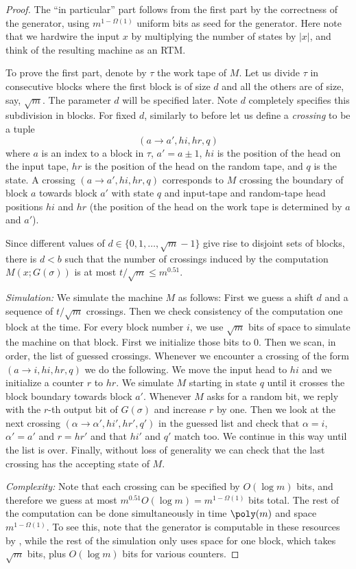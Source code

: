 \begin{proof}
The ``in particular'' part follows from the first part by the correctness
of the generator, using $m^{1-\Omega(1)}$ uniform bits as seed for
the generator. Here note that we hardwire the input $x$ by multiplying
the number of states by $|x|$, and think of the resulting machine
as an RTM.

To prove the first part, denote by $\tau$ the work tape of $M$.
Let us divide $\tau$ in consecutive blocks where the first block
is of size $d$ and all the others are of size, say, $\sqrt{m}$.
The parameter $d$ will be specified later. Note $d$ completely specifies
this subdivision in blocks. For fixed $d$, similarly to before let
us define a \emph{crossing} to be a tuple 
\[
(a\rightarrow a',hi,hr,q)
\]
where $a$ is an index to a block in $\tau$, $a'=a\pm1$, $hi$ is
the position of the head on the input tape, $hr$ is the position
of the head on the random tape, and $q$ is the state. A crossing
$(a\rightarrow a',hi,hr,q)$ corresponds to $M$ crossing the boundary
of block $a$ towards block $a'$ with state $q$ and input-tape and
random-tape head positions $hi$ and $hr$ (the position of the head
on the work tape is determined by $a$ and $a'$).

Since different values of $d\in\{0,1,\ldots,\sqrt{m}-1\}$ give rise
to disjoint sets of blocks, there is $d<b$ such that the number of
crossings induced by the computation $M(x;G(\sigma))$ is at most
$t/\sqrt{m}\leq m^{0.51}$.

\emph{Simulation:} We simulate the machine $M$ as follows: First
we guess a shift $d$ and a sequence of $t/\sqrt{m}$ crossings. Then
we check consistency of the computation one block at the time. For
every block number $i$, we use $\sqrt{m}$ bits of space to simulate
the machine on that block. First we initialize those bits to $0$.
Then we scan, in order, the list of guessed crossings. Whenever we
encounter a crossing of the form $(a\rightarrow i,hi,hr,q)$ we do
the following. We move the input head to $hi$ and we initialize a
counter $r$ to $hr$. We simulate $M$ starting in state $q$ until
it crosses the block boundary towards block $a'$. Whenever $M$ asks
for a random bit, we reply with the $r$-th output bit of $G(\sigma)$
and increase $r$ by one. Then we look at the next crossing $(\alpha\rightarrow\alpha',hi',hr',q')$
in the guessed list and check that $\alpha=i$, $\alpha'=a'$ and
$r=hr'$ and that $hi'$ and $q'$ match too. We continue in this
way until the list is over. Finally, without loss of generality we
can check that the last crossing has the accepting state of $M$.

\emph{Complexity:} Note that each crossing can be specified by $O(\log m)$
bits, and therefore we guess at most $m^{0.51}O(\log m)=m^{1-\Omega(1)}$
bits total. The rest of the computation can be done simultaneously
in time $\poly(m)$ and space $m^{1-\Omega(1)}$. To see this, note
that the generator is computable in these resources by ,
while the rest of the simulation only uses space for one block, which
takes $\sqrt{m}$ bits, plus $O(\log m)$ bits for various counters.
\end{proof}

